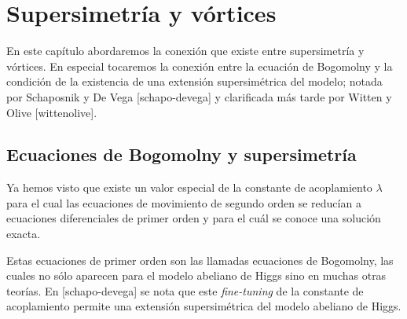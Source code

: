 
\chapter{Supersimetría y vórtices} %

\label{ch:supervortices} %


En este capítulo abordaremos la conexión que existe entre supersimetría y vórtices. En especial tocaremos la conexión entre la ecuación de Bogomolny y la condición de la existencia de una extensión supersimétrica del modelo; notada por Schaposnik y De Vega [schapo-devega] y clarificada más tarde por Witten y Olive [wittenolive].

\section{Ecuaciones de Bogomolny y supersimetría}

Ya hemos visto que existe un valor especial de la constante de acoplamiento $\lambda$ para el cual las ecuaciones de movimiento de segundo orden se reducían a ecuaciones diferenciales de primer orden y para el cuál se conoce una solución exacta.

Estas ecuaciones de primer orden son las llamadas ecuaciones de Bogomolny, las cuales no sólo aparecen para el modelo abeliano de Higgs sino en muchas otras teorías. En [schapo-devega] se nota que este \emph{fine-tuning} de la constante de acoplamiento permite una extensión supersimétrica del modelo abeliano de Higgs.

